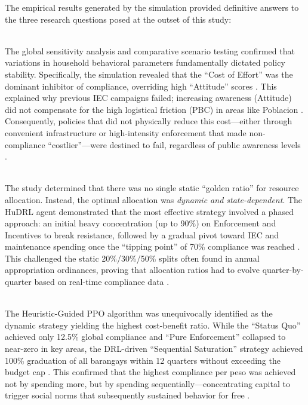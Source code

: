 The empirical results generated by the simulation provided definitive answers to the three research questions posed at the outset of this study:

\\
The global sensitivity analysis and comparative scenario testing confirmed that variations in household behavioral parameters fundamentally dictated policy stability. Specifically, the simulation revealed that the ``Cost of Effort'' was the dominant inhibitor of compliance, overriding high ``Attitude'' scores \citep{Zheng2022}. This explained why previous IEC campaigns failed; increasing awareness (Attitude) did not compensate for the high logistical friction (PBC) in areas like Poblacion \citep{Moeini2023}. Consequently, policies that did not physically reduce this cost—either through convenient infrastructure or high-intensity enforcement that made non-compliance ``costlier''—were destined to fail, regardless of public awareness levels \citep{Chen2023, Badua2022}.

\\
The study determined that there was no single static ``golden ratio'' for resource allocation. Instead, the optimal allocation was \textit{dynamic and state-dependent}. The HuDRL agent demonstrated that the most effective strategy involved a phased approach: an initial heavy concentration (up to 90\%) on Enforcement and Incentives to break resistance, followed by a gradual pivot toward IEC and maintenance spending once the ``tipping point'' of 70\% compliance was reached \citep{Nishimura2022}. This challenged the static 20\%/30\%/50\% splits often found in annual appropriation ordinances, proving that allocation ratios had to evolve quarter-by-quarter based on real-time compliance data \citep{Abdallah2021, Torkayesh2021}.

\\
The Heuristic-Guided PPO algorithm was unequivocally identified as the dynamic strategy yielding the highest cost-benefit ratio. While the ``Status Quo'' achieved only 12.5\% global compliance and ``Pure Enforcement'' collapsed to near-zero in key areas, the DRL-driven ``Sequential Saturation'' strategy achieved 100\% graduation of all barangays within 12 quarters without exceeding the budget cap \citep{Jimenez2025}. This confirmed that the highest compliance per peso was achieved not by spending more, but by spending sequentially—concentrating capital to trigger social norms that subsequently sustained behavior for free \citep{ZhengAI2022, Andre2021}.